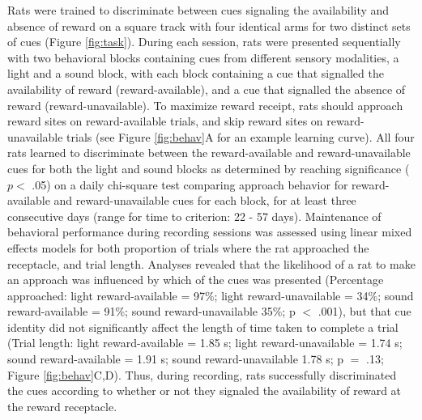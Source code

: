 \documentclass[11pt]{article}
\begin{document}
{Rats were trained to discriminate between cues signaling the availability and
absence of reward on a square track with four identical arms for two distinct
sets of cues (Figure \ref{fig:task}). During each session, rats were presented
sequentially with two behavioral blocks containing cues from different sensory
modalities, a light and a sound block, with each block containing a cue that
signalled the availability of reward (reward-available), and a cue that
signalled the absence of reward (reward-unavailable). To maximize reward
receipt, rats should approach reward sites on reward-available trials, and skip
reward sites on reward-unavailable trials (see Figure \ref{fig:behav}A for an
example learning curve). All four rats learned to discriminate between the
reward-available and reward-unavailable cues for both the light and sound blocks
as determined by reaching significance ($p <$ .05) on a daily chi-square test
comparing approach behavior for reward-available and reward-unavailable cues for
each block, for at least three consecutive days (range for time to criterion: 22
- 57 days). Maintenance of behavioral performance during recording sessions was
assessed using linear mixed effects models for both proportion of trials where
the rat approached the receptacle, and trial length. Analyses revealed that the
likelihood of a rat to make an approach was influenced by which of the cues was
presented (Percentage approached: light reward-available = 97\%; light
reward-unavailable = 34\%; sound reward-available = 91\%; sound
reward-unavailable 35\%; p $<$ .001), but that cue identity did not
significantly affect the length of time taken to complete a trial (Trial length:
light reward-available = 1.85 s; light reward-unavailable = 1.74 s; sound
reward-available = 1.91 s; sound reward-unavailable 1.78 s; p $=$ .13; Figure
\ref{fig:behav}C,D). Thus, during recording, rats successfully discriminated the
cues according to whether or not they signaled the availability of reward at the
reward receptacle.

}
\end{document}

